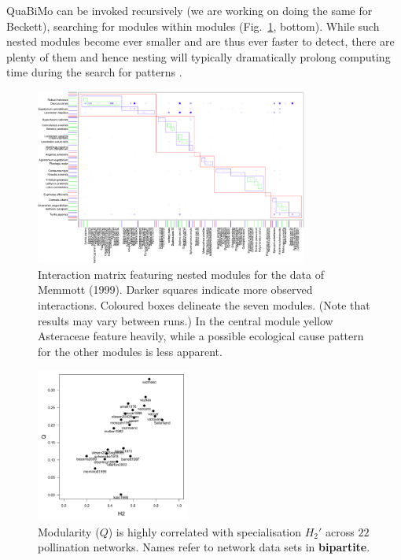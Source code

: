 \documentclass[a4paper, 11pt]{article}\usepackage[]{graphicx}\usepackage[dvipsnames]{xcolor}
\newcommand{\package}[1]{\textbf{#1}}
\begin{document}
QuaBiMo can be invoked recursively (we are working on doing the same for Beckett), searching for modules within modules (Fig.~\ref{fig:memmottmodules}, bottom). While such nested modules become ever smaller and are thus ever faster to detect, there are plenty of them and hence nesting will typically dramatically prolong computing time during the search for patterns \citep{Memmott1999}.
\begin{figure}
	\includegraphics[width=0.8\textwidth]{figures/memmott1999_nested_modules_small.png}
	\caption{Interaction matrix featuring nested modules for the data of Memmott (1999). %
	Darker squares indicate more observed interactions. Coloured boxes delineate the seven modules. (Note that results may vary between runs.) In the central module yellow Asteraceae feature heavily, while a possible ecological cause pattern for the other modules is less apparent. %
	}
\label{fig:memmottmodules}
\end{figure}
%
\begin{figure}
	\centering
	\includegraphics[width=0.45\textwidth]{figures/poll_mod_QvsH2}
	\caption{Modularity ($Q$) is highly correlated with specialisation $H_2'$ across $22$ pollination networks. Names refer to network data sets in \package{bipartite}.}
\label{fig:QvsH2}
\end{figure}
\end{document}
